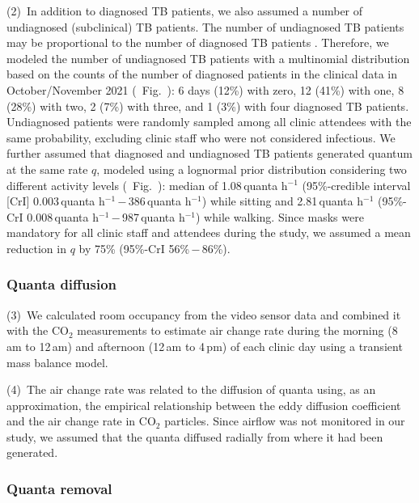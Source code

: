 \documentclass[fleqn,11pt]{wlscirep}
\begin{document}
(2)~In addition to diagnosed TB patients, we also assumed a number of undiagnosed (subclinical) TB patients. The number of undiagnosed TB patients may be proportional to the number of diagnosed TB patients \cite{Berhanu2023CID,Moyo2022LancetID,Patterson2024PNAS}. Therefore, we modeled the number of undiagnosed TB patients with a multinomial distribution based on the counts of the number of diagnosed patients in the clinical data in October/November 2021 (\supp~Fig.~): 6 days (12\%) with zero, 12 (41\%) with one, 8 (28\%) with two, 2 (7\%) with three, and 1 (3\%) with four diagnosed TB patients. Undiagnosed patients were randomly sampled among all clinic attendees with the same probability, excluding clinic staff who were not considered infectious. We further assumed that diagnosed and undiagnosed TB patients generated quantum at the same rate $q$, modeled using a lognormal prior distribution considering two different activity levels (\supp~Fig.~): median of 1.08\,quanta h$^{-1}$ (95\%-credible interval [CrI] 0.003\,quanta h$^{-1}$\,$-$\,386\,quanta h$^{-1}$) while sitting and 2.81\,quanta h$^{-1}$ (95\%-CrI 0.008\,quanta h$^{-1}$\,$-$\,987\,quanta h$^{-1}$) while walking\cite{Mikszewski2021GF,Buonanno2020EI,Banholzer2024PGPH}. Since masks were mandatory for all clinic staff and attendees during the study, we assumed a mean reduction in $q$ by 75\% (95\%-CrI 56\%\,$-$\,86\%)\cite{Dharmadhikari2012AJRCCM,McCreesh2021BMJGlobalHealth}.

\subsubsection*{Quanta diffusion}

(3)~We calculated room occupancy from the video sensor data and combined it with the CO$_2$ measurements to estimate air change rate during the morning (8\,am to 12\,am) and afternoon (12\,am to 4\,pm) of each clinic day using a transient mass balance model\cite{Batterman2017IJERPH}. 

(4)~The air change rate was related to the diffusion of quanta using, as an approximation, the empirical relationship between the eddy diffusion coefficient and the air change rate in CO$_2$ particles\cite{Cheng2011EnvSciTech,Foat2020BE}. Since airflow was not monitored in our study, we assumed that the quanta diffused radially from where it had been generated. 

\subsubsection*{Quanta removal}
\end{document}
